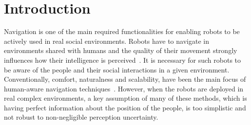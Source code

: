 \section{Introduction}


Navigation is one of the main required functionalities for enabling robots to be actively used in real social environments. %
Robots have to navigate in environments shared with humans and the quality of their movement strongly influences how their intelligence is perceived~\cite{Althaus2004}. It is necessary for such robots to be aware of the people and their social interactions in a given environment. Conventionally, comfort, naturalness and scalability, have been the main focus of human-aware navigation techniques~\cite{Kruse2013}. However, when the robots are deployed in real complex environments, a key assumption of many of these methods, which is having perfect information about the position of the people, is too simplistic and not robust to non-negligible perception uncertainty.%


